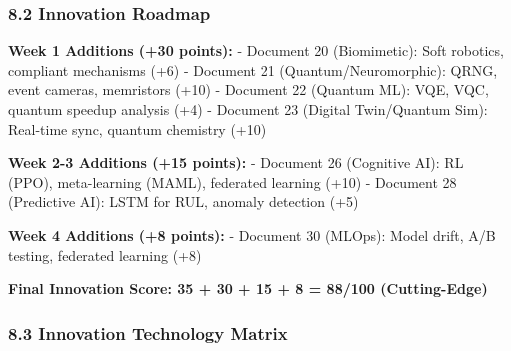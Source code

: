 \documentclass[
]{article}
\begin{document}
\hypertarget{innovation-roadmap}{%
\subsubsection{8.2 Innovation Roadmap}\label{innovation-roadmap}}

\textbf{Week 1 Additions (+30 points):} - Document 20 (Biomimetic): Soft
robotics, compliant mechanisms (+6) - Document 21
(Quantum/Neuromorphic): QRNG, event cameras, memristors (+10) - Document
22 (Quantum ML): VQE, VQC, quantum speedup analysis (+4) - Document 23
(Digital Twin/Quantum Sim): Real-time sync, quantum chemistry (+10)

\textbf{Week 2-3 Additions (+15 points):} - Document 26 (Cognitive AI):
RL (PPO), meta-learning (MAML), federated learning (+10) - Document 28
(Predictive AI): LSTM for RUL, anomaly detection (+5)

\textbf{Week 4 Additions (+8 points):} - Document 30 (MLOps): Model
drift, A/B testing, federated learning (+8)

\textbf{Final Innovation Score: 35 + 30 + 15 + 8 = 88/100
(Cutting-Edge)}

\hypertarget{innovation-technology-matrix}{%
\subsubsection{8.3 Innovation Technology
Matrix}\label{innovation-technology-matrix}}
\end{document}
